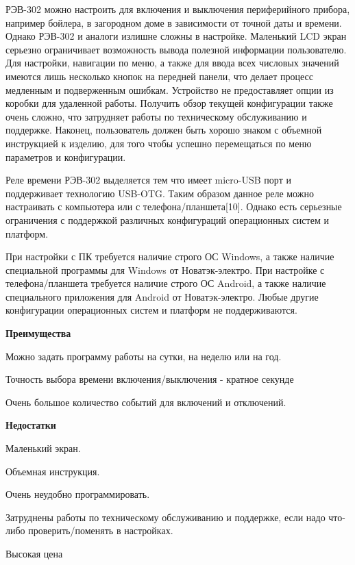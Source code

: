 РЭВ-302 можно настроить для включения и выключения периферийного прибора, например бойлера, в загородном доме в зависимости от точной даты и времени. Однако РЭВ-302 и аналоги излишне сложны в настройке.  Маленький LCD экран серьезно ограничивает возможность вывода полезной информации пользователю. Для настройки, навигации по меню, а также для ввода всех числовых значений имеются лишь несколько кнопок на передней панели, что делает процесс медленным и подверженным ошибкам. Устройство не предоставляет опции из коробки для удаленной работы. Получить обзор текущей конфигурации также очень сложно, что затрудняет работы по техническому обслуживанию и поддержке. Наконец, пользователь должен быть хорошо знаком с объемной инструкцией к изделию, для того чтобы успешно перемещаться по меню параметров и конфигурации. 

Реле времени РЭВ-302 выделяется тем что имеет micro-USB порт и поддерживает технологию USB-OTG. Таким образом данное реле можно настраивать с компьютера или с телефона/планшета[10]. Однако есть серьезные ограничения с поддержкой различных конфигураций операционных систем и платформ.

При настройки с ПК требуется наличие строго ОС Windows, а также наличие специальной программы для Windows от Новатэк-электро. При настройке с телефона/планшета требуется наличие строго ОС Android, а также наличие специального приложения для Android от Новатэк-электро. Любые другие конфигурации операционных систем и платформ не поддерживаются.

\textbf{Преимущества}
\begin{my_enumerate}
\item Можно задать программу работы на сутки, на неделю или на год.
\item Точность выбора времени включения/выключения - кратное секунде
\item Очень большое количество событий для включений и отключений.
\end{my_enumerate}

\textbf{Недостатки}
\begin{my_enumerate}
\item Маленький экран.
\item Объемная инструкция.
\item Очень неудобно программировать.
\item Затруднены работы по техническому обслуживанию и поддержке, если надо что-либо проверить/поменять в настройках.
\item Высокая цена
\end{my_enumerate}


